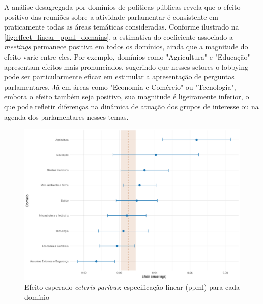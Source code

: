 A análise desagregada por domínios de políticas públicas revela que o efeito positivo das reuniões sobre a atividade parlamentar é consistente em praticamente todas as áreas temáticas consideradas. Conforme ilustrado na \autoref{fig:effect_linear_ppml_domains}, a estimativa do coeficiente associado a \textit{meetings} permanece positiva em todos os domínios, ainda que a magnitude do efeito varie entre eles. Por exemplo, domínios como "Agricultura" e "Educação" apresentam efeitos mais pronunciados, sugerindo que nesses setores o lobbying pode ser particularmente eficaz em estimular a apresentação de perguntas parlamentares. Já em áreas como "Economia e Comércio" ou "Tecnologia", embora o efeito também seja positivo, sua magnitude é ligeiramente inferior, o que pode refletir diferenças na dinâmica de atuação dos grupos de interesse ou na agenda dos parlamentares nesses temas.

\begin{figure}[htbp]
\centering
\includegraphics[width=\textwidth]{figures/fig_coeff_domains.pdf}
\caption{Efeito esperado \textit{ceteris paribus}: especificação linear (\acrshort{ppml}) para cada domínio}
\label{fig:effect_linear_ppml_domains}
\end{figure}

